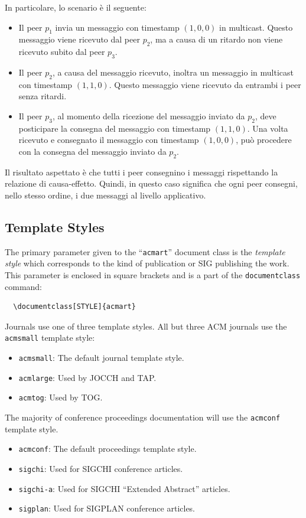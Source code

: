\documentclass[acmtog]{acmart}
\begin{document}
In particolare, lo scenario è il seguente:
\begin{itemize}
\item Il peer $p_1$ invia un messaggio con timestamp $(1, 0, 0)$ in multicast. Questo messaggio viene ricevuto dal peer $p_2$, ma a causa di un ritardo non viene ricevuto subito dal peer $p_3$.
\item Il peer $p_2$, a causa del messaggio ricevuto, inoltra un messaggio in multicast con timestamp $(1, 1, 0)$. Questo messaggio viene ricevuto da entrambi i peer senza ritardi. 
\item Il peer $p_3$, al momento della ricezione del messaggio inviato da $p_2$, deve posticipare la consegna del messaggio con timestamp $(1, 1, 0)$. Una volta ricevuto e consegnato il messaggio con timestamp $(1, 0, 0)$, può procedere con la consegna del messaggio inviato da $p_2$.
\end{itemize}

Il risultato aspettato è che tutti i peer consegnino i messaggi rispettando la relazione di causa-effetto. Quindi, in questo caso significa che ogni peer consegni, nello stesso ordine, i due messaggi al livello applicativo.

\subsection{Template Styles}

The primary parameter given to the ``\verb|acmart|'' document class is
the {\itshape template style} which corresponds to the kind of publication
or SIG publishing the work. This parameter is enclosed in square
brackets and is a part of the {\verb|documentclass|} command:
\begin{verbatim}
  \documentclass[STYLE]{acmart}
\end{verbatim}

Journals use one of three template styles. All but three ACM journals
use the {\verb|acmsmall|} template style:
\begin{itemize}
\item {\verb|acmsmall|}: The default journal template style.
\item {\verb|acmlarge|}: Used by JOCCH and TAP.
\item {\verb|acmtog|}: Used by TOG.
\end{itemize}

The majority of conference proceedings documentation will use the {\verb|acmconf|} template style.
\begin{itemize}
\item {\verb|acmconf|}: The default proceedings template style.
\item{\verb|sigchi|}: Used for SIGCHI conference articles.
\item{\verb|sigchi-a|}: Used for SIGCHI ``Extended Abstract'' articles.
\item{\verb|sigplan|}: Used for SIGPLAN conference articles.
\end{itemize}
\end{document}
